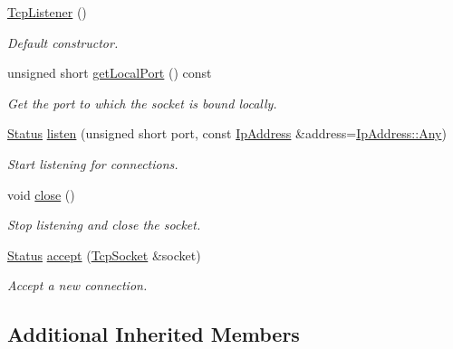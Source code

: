 \begin{DoxyCompactItemize}
\item 
\mbox{\label{classsf_1_1_tcp_listener_a59a1db5b6f4711a3e57390da2f8d9630}} 
\hyperlink{classsf_1_1_tcp_listener_a59a1db5b6f4711a3e57390da2f8d9630}{Tcp\+Listener} ()
\begin{DoxyCompactList}\small\item\em Default constructor. \end{DoxyCompactList}\item 
unsigned short \hyperlink{classsf_1_1_tcp_listener_a784b9a9c59d4cdbae1795e90b8015780}{get\+Local\+Port} () const
\begin{DoxyCompactList}\small\item\em Get the port to which the socket is bound locally. \end{DoxyCompactList}\item 
\hyperlink{classsf_1_1_socket_a51bf0fd51057b98a10fbb866246176dc}{Status} \hyperlink{classsf_1_1_tcp_listener_a9504758ea3570e62cb20b209c11776a1}{listen} (unsigned short port, const \hyperlink{classsf_1_1_ip_address}{Ip\+Address} \&address=\hyperlink{classsf_1_1_ip_address_a3dbc10b0dc6804cc69e29342f7406907}{Ip\+Address\+::\+Any})
\begin{DoxyCompactList}\small\item\em Start listening for connections. \end{DoxyCompactList}\item 
void \hyperlink{classsf_1_1_tcp_listener_a3a00a850506bd0f9f48867a0fe59556b}{close} ()
\begin{DoxyCompactList}\small\item\em Stop listening and close the socket. \end{DoxyCompactList}\item 
\hyperlink{classsf_1_1_socket_a51bf0fd51057b98a10fbb866246176dc}{Status} \hyperlink{classsf_1_1_tcp_listener_ae2c83ce5a64d50b68180c46bef0a7346}{accept} (\hyperlink{classsf_1_1_tcp_socket}{Tcp\+Socket} \&socket)
\begin{DoxyCompactList}\small\item\em Accept a new connection. \end{DoxyCompactList}\end{DoxyCompactItemize}
\subsection*{Additional Inherited Members}



